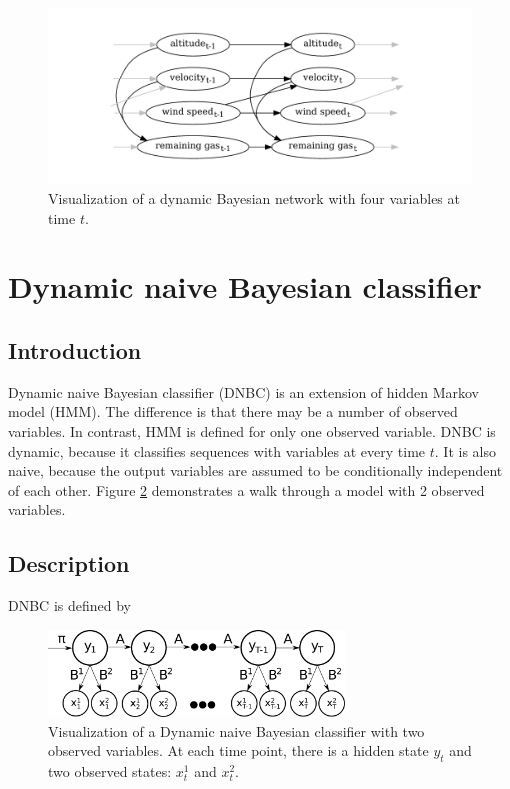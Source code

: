 \documentclass[thesis=B,english]{FITthesis}[2012/06/26]
\begin{document}
\begin{figure}
	\centering
 	\includegraphics[width=1\textwidth]{dbn}
 	\caption{Visualization of a dynamic Bayesian network with four variables at time $t$.}
 	\label{fig:dbn}
\end{figure}

\section{Dynamic naive Bayesian classifier}

\subsection{Introduction}

Dynamic naive Bayesian classifier (DNBC) is an extension of hidden Markov model (HMM). The difference is that there may be a number of observed variables. In contrast, HMM is defined for only one observed variable. DNBC is dynamic, because it classifies sequences with variables at every time $t$. It is also naive, because the output variables are assumed to be conditionally independent of each other. Figure \ref{fig:dnbc} demonstrates a walk through a model with 2 observed variables. 

\subsection{Description}

DNBC is defined by

\begin{figure}
	\centering
 	\includegraphics[width=0.7\textwidth]{dnbc}
 	\caption{Visualization of a Dynamic naive Bayesian classifier with two observed variables. At each time point, there is a hidden state $y_t$ and two observed states: $x_t^1$ and $x_t^2$.}
 	\label{fig:dnbc}
\end{figure}
\end{document}
